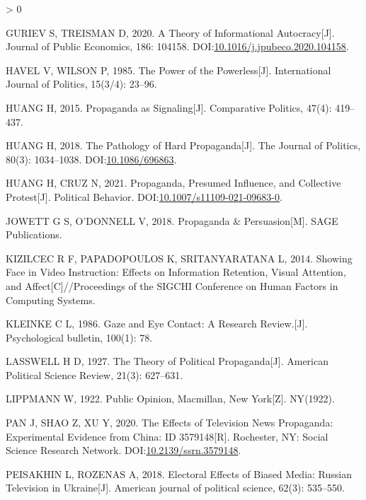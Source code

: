 \documentclass[
  12pt,
]{ctexart}
\newlength{\cslhangindent}
\newenvironment{CSLReferences}[2] %
 {%
  \setlength{\parindent}{0pt}
  \ifodd #1 \everypar{\setlength{\hangindent}{\cslhangindent}}\ignorespaces\fi
  \ifnum #2 > 0
  \setlength{\parskip}{#2\baselineskip}
  \fi
 }%
 {}
\begin{document}
\begin{CSLReferences}{1}{0}
\leavevmode\hypertarget{ref-GurievTreisman2020}{}%
GURIEV S, TREISMAN D, 2020. A Theory of Informational Autocracy{[}J{]}. Journal of Public Economics, 186: 104158. DOI:\href{https://doi.org/10.1016/j.jpubeco.2020.104158}{10.1016/j.jpubeco.2020.104158}.

\leavevmode\hypertarget{ref-HavelWilson1985}{}%
HAVEL V, WILSON P, 1985. The Power of the Powerless{[}J{]}. International Journal of Politics, 15(3/4): 23--96.

\leavevmode\hypertarget{ref-Huang2015a}{}%
HUANG H, 2015. Propaganda as {Signaling}{[}J{]}. Comparative Politics, 47(4): 419--437.

\leavevmode\hypertarget{ref-Huang2018}{}%
HUANG H, 2018. The {Pathology} of {Hard Propaganda}{[}J{]}. The Journal of Politics, 80(3): 1034--1038. DOI:\href{https://doi.org/10.1086/696863}{10.1086/696863}.

\leavevmode\hypertarget{ref-HuangCruz2021}{}%
HUANG H, CRUZ N, 2021. Propaganda, {Presumed Influence}, and {Collective Protest}{[}J{]}. Political Behavior. DOI:\href{https://doi.org/10.1007/s11109-021-09683-0}{10.1007/s11109-021-09683-0}.

\leavevmode\hypertarget{ref-JowettODonnell2018}{}%
JOWETT G S, O'DONNELL V, 2018. Propaganda \& {Persuasion}{[}M{]}. {SAGE Publications}.

\leavevmode\hypertarget{ref-KizilcecEtAl2014}{}%
KIZILCEC R F, PAPADOPOULOS K, SRITANYARATANA L, 2014. Showing Face in Video Instruction: Effects on Information Retention, Visual Attention, and Affect{[}C{]}//Proceedings of the {SIGCHI} Conference on Human Factors in Computing Systems.

\leavevmode\hypertarget{ref-Kleinke1986}{}%
KLEINKE C L, 1986. Gaze and Eye Contact: A Research Review.{[}J{]}. Psychological bulletin, 100(1): 78.

\leavevmode\hypertarget{ref-Lasswell1927}{}%
LASSWELL H D, 1927. The Theory of Political Propaganda{[}J{]}. American Political Science Review, 21(3): 627--631.

\leavevmode\hypertarget{ref-Lippmann1922}{}%
LIPPMANN W, 1922. Public Opinion, {Macmillan}, {New York}{[}Z{]}. {NY}(1922).

\leavevmode\hypertarget{ref-PanEtAl2020}{}%
PAN J, SHAO Z, XU Y, 2020. The {Effects} of {Television News Propaganda}: {Experimental Evidence} from {China}: ID 3579148{[}R{]}. {Rochester, NY}: {Social Science Research Network}. DOI:\href{https://doi.org/10.2139/ssrn.3579148}{10.2139/ssrn.3579148}.

\leavevmode\hypertarget{ref-PeisakhinRozenas2018}{}%
PEISAKHIN L, ROZENAS A, 2018. Electoral Effects of Biased Media: {Russian} Television in {Ukraine}{[}J{]}. American journal of political science, 62(3): 535--550.


\end{CSLReferences}
\end{document}
